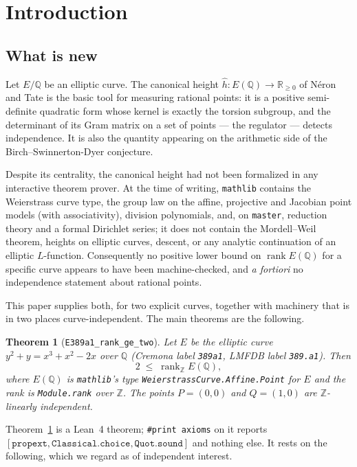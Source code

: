 \documentclass[11pt,reqno]{amsart}
\theoremstyle{plain}
\newtheorem{theorem}{Theorem}[section]
\theoremstyle{definition}
\theoremstyle{remark}
\DeclareRobustCommand{\lt}[1]{\texttt{#1}}
\newcommand{\hh}{\widehat{h}}
\DeclareMathOperator{\rank}{rank}
\begin{document}
\section{Introduction}

\subsection{What is new}

Let $E/\mathbb{Q}$ be an elliptic curve. The canonical height
$\hh \colon E(\mathbb{Q}) \to \mathbb{R}_{\ge 0}$ of N\'eron and Tate is the
basic tool for measuring rational points: it is a positive semi-definite
quadratic form whose kernel is exactly the torsion subgroup, and the
determinant of its Gram matrix on a set of points --- the regulator ---
detects independence. It is also the quantity appearing on the arithmetic
side of the Birch--Swinnerton-Dyer conjecture.

Despite its centrality, the canonical height had not been formalized in any
interactive theorem prover. At the time of writing, \texttt{mathlib} contains
the Weierstrass curve type, the group law on the affine, projective and
Jacobian point models (with associativity), division polynomials, and, on
\texttt{master}, reduction theory and a formal Dirichlet series; it does not
contain the Mordell--Weil theorem, heights on elliptic curves, descent, or
any analytic continuation of an elliptic $L$-function. Consequently no
positive lower bound on $\rank E(\mathbb{Q})$ for a specific curve appears to
have been machine-checked, and \emph{a fortiori} no independence statement
about rational points.

This paper supplies both, for two explicit curves, together with machinery
that is in two places curve-independent. The main theorems are the following.

\begin{theorem}[\lt{E389a1\_rank\_ge\_two}]\label{thm:main}
Let $E$ be the elliptic curve $y^2 + y = x^3 + x^2 - 2x$ over $\mathbb{Q}$
(Cremona label \texttt{389a1}, LMFDB label \texttt{389.a1}). Then
\[
  2 \;\le\; \operatorname{rank}_{\mathbb{Z}} E(\mathbb{Q}),
\]
where $E(\mathbb{Q})$ is \texttt{mathlib}'s type
\lt{WeierstrassCurve.Affine.Point} for $E$ and the rank is
\lt{Module.rank} over $\mathbb{Z}$. The points $P = (0,0)$ and $Q = (1,0)$
are $\mathbb{Z}$-linearly independent.
\end{theorem}

Theorem~\ref{thm:main} is a Lean~4 theorem; \lt{\#print axioms} on it reports
$[\mathtt{propext}, \mathtt{Classical.choice}, \mathtt{Quot.sound}]$ and
nothing else. It rests on the following, which we regard as of independent
interest.
\end{document}
